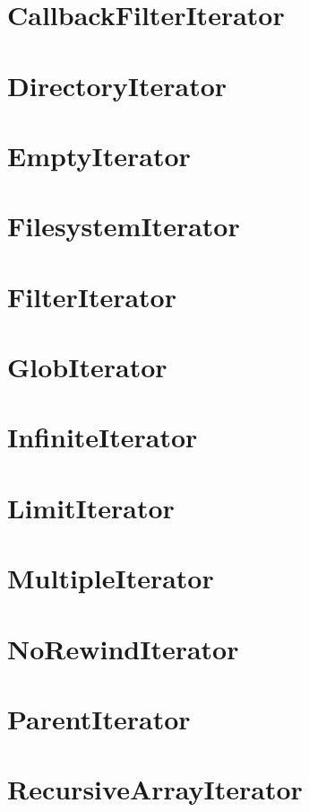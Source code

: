 \section{CallbackFilterIterator}


\section{DirectoryIterator}


\section{EmptyIterator}


\section{FilesystemIterator}


\section{FilterIterator}


\section{GlobIterator}


\section{InfiniteIterator}


\section{LimitIterator}


\section{MultipleIterator}


\section{NoRewindIterator}


\section{ParentIterator}


\section{RecursiveArrayIterator}


